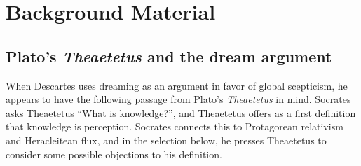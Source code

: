 \chapter{Background Material}

\section*{Plato's \textit{Theaetetus} and the dream argument}

When Descartes uses dreaming as an argument in favor of global scepticism, he appears to have the following passage from Plato's \textit{Theaetetus} in mind. Socrates asks Theaetetus ``What is knowledge?'', and Theaetetus offers as a first definition that knowledge is perception. Socrates connects this to Protagorean relativism and Heracleitean flux, and in the selection below, he presses Theaetetus to consider some possible objections to his definition.

